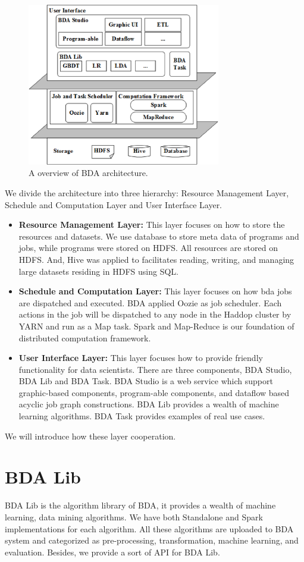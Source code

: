 \documentclass{sig-alternate-05-2015}
\begin{document}
\begin{figure}
\centering
\includegraphics[height=2.8in]{cikm-architecture.eps}
\caption{ A overview of BDA architecture.}
\label{fig:arch}
\end{figure}

We divide the architecture into three hierarchy: Resource Management Layer, Schedule and Computation Layer and User Interface Layer.
\begin{itemize}
\item \textbf{Resource Management Layer:} This layer focuses on how to store the resources and datasets. We use database to store meta data of programs and jobs, while programs were stored on HDFS. All resources are stored on HDFS. And, Hive was applied to facilitates reading, writing, and managing large datasets residing in HDFS using SQL.
\item \textbf{Schedule and Computation Layer:} This layer focuses on how bda jobs are dispatched and executed. BDA applied Oozie as job scheduler. Each actions in the job will be dispatched to any node in the Haddop cluster by YARN and run as a Map task. Spark and Map-Reduce is our foundation of distributed computation framework.
\item \textbf{User Interface Layer:} This layer focuses how to provide friendly functionality for data scientists. There are three components, BDA Studio, BDA Lib and BDA Task. BDA Studio is a web service which support graphic-based components, program-able components, and dataflow based acyclic job graph constructions. BDA Lib provides a wealth of machine learning algorithms. BDA Task provides examples of real use cases.
\end{itemize}
We will introduce how these layer cooperation.


\section{BDA Lib}
BDA Lib is the algorithm library of BDA, it provides a wealth of machine learning, data mining algorithms. We have both Standalone and Spark implementations for each algorithm. All these algorithms are uploaded to BDA system and categorized as pre-processing, transformation, machine learning, and evaluation. Besides, we provide a sort of API for BDA Lib.
\end{document}
